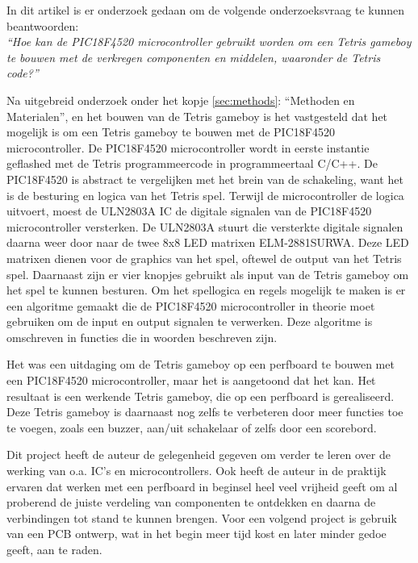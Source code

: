 In dit artikel is er onderzoek gedaan om de volgende onderzoeksvraag te kunnen beantwoorden:\\
\textit{``Hoe kan de PIC18F4520 microcontroller gebruikt worden om een Tetris gameboy te bouwen met de verkregen componenten en middelen, waaronder de Tetris code?''} 

Na uitgebreid onderzoek onder het kopje \ref{sec:methods}: ``Methoden en Materialen'', en het bouwen van de Tetris gameboy is het vastgesteld dat het mogelijk is om een Tetris gameboy te bouwen met de PIC18F4520 microcontroller. 
De PIC18F4520 microcontroller wordt in eerste instantie geflashed met de Tetris programmeercode in programmeertaal C/C++. 
De PIC18F4520 is abstract te vergelijken met het brein van de schakeling, want het is de besturing en logica van het Tetris spel. 
Terwijl de microcontroller de logica uitvoert, moest de ULN2803A IC de digitale signalen van de PIC18F4520 microcontroller versterken. 
De ULN2803A stuurt die versterkte digitale signalen daarna weer door naar de twee 8x8 LED matrixen ELM-2881SURWA. 
Deze LED matrixen dienen voor de graphics van het spel, oftewel de output van het Tetris spel. Daarnaast zijn er vier knopjes gebruikt als input van de Tetris gameboy om het spel te kunnen besturen. 
Om het spellogica en regels mogelijk te maken is er een algoritme gemaakt die de PIC18F4520 microcontroller in theorie moet gebruiken om de input en output signalen te verwerken. 
Deze algoritme is omschreven in functies die in woorden beschreven zijn.

Het was een uitdaging om de Tetris gameboy op een perfboard te bouwen met een PIC18F4520 microcontroller, maar het is aangetoond dat het kan. Het resultaat is een werkende Tetris gameboy, die op een perfboard is gerealiseerd. 
Deze Tetris gameboy is daarnaast nog zelfs te verbeteren door meer functies toe te voegen, zoals een buzzer, aan/uit schakelaar of zelfs door een scorebord. 

Dit project heeft de auteur de gelegenheid gegeven om verder te leren over de werking van o.a. IC's en microcontrollers. Ook heeft de auteur in de praktijk ervaren dat werken met een perfboard in beginsel heel veel vrijheid geeft om al proberend de juiste verdeling van componenten te ontdekken en daarna de verbindingen tot stand te kunnen brengen. Voor een volgend project is gebruik van een PCB ontwerp, wat in het begin meer tijd kost en later minder gedoe geeft, aan te raden. 